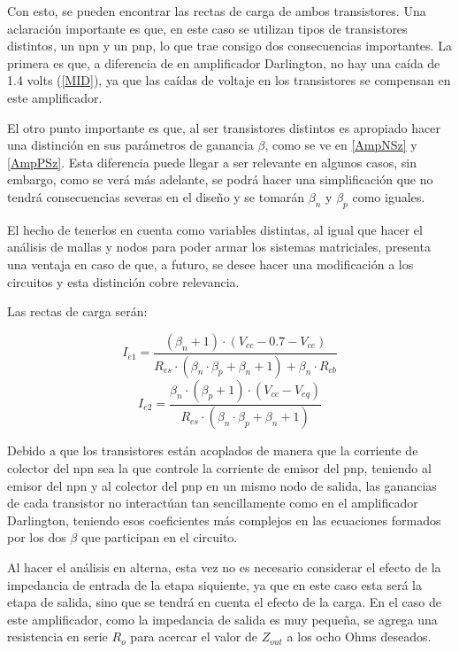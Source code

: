 Con esto, se pueden encontrar las rectas de carga de ambos transistores. Una aclaración importante es que, en este caso se utilizan tipos de transistores distintos, un npn y un pnp, lo que trae consigo dos consecuencias importantes. La primera es que, a diferencia de en amplificador Darlington, no hay una caída de 1.4 volts (\cref{MID}), ya que las caídas de voltaje en los transistores se compensan en este amplificador.

El otro punto importante es que, al ser transistores distintos es apropiado hacer una distinción en sus parámetros de ganancia $\beta$, como se ve en \cref{AmpNSz} y \cref{AmpPSz}. Esta diferencia puede llegar a ser relevante en algunos casos, sin embargo, como se verá más adelante, se podrá hacer una simplificación que no tendrá consecuencias severas en el diseño y se tomarán $\beta_n$ y $\beta_p$ como iguales. 

El hecho de tenerlos en cuenta como variables distintas, al igual que hacer el análisis de mallas y nodos para poder armar los sistemas matriciales, presenta una ventaja en caso de que, a futuro, se desee hacer una modificación a los circuitos y esta distinción cobre relevancia.

Las rectas de carga serán:

\begin{equation}
    I_{e1} = \frac{(\beta_n +1) \cdot (V_{cc}-0.7-V_{ce})}{R_{es}\cdot (\beta_n\cdot\beta_p + \beta_n+1) + \beta_n\cdot R_{cb}}
    \label{Car_NSz}
\end{equation}
\begin{equation}
    I_{e2} = \frac{\beta_n\cdot(\beta_p+1)\cdot(V_{cc}-V_{eq})}{R_{es}\cdot (\beta_n\cdot\beta_p + \beta_n+1)}
    \label{Car_PSz}
\end{equation}

Debido a que los transistores están acoplados de manera que la corriente de colector del npn sea la que controle la corriente de emisor del pnp, teniendo al emisor del npn y al colector del pnp en un mismo nodo de salida, las ganancias de cada transistor no interactúan tan sencillamente como en el amplificador Darlington, teniendo esos coeficientes más complejos en las ecuaciones formados por los dos $\beta$ que participan en el circuito.

Al hacer el análisis en alterna, esta vez no es necesario considerar el efecto de la impedancia de entrada de la etapa siquiente, ya que en este caso esta será la etapa de salida, sino que se tendrá en cuenta el efecto de la carga. En el caso de este amplificador, como la impedancia de salida es muy pequeña, se agrega una resistencia en serie $R_o$ para acercar el valor de $Z_{out}$ a los ocho Ohms deseados.

